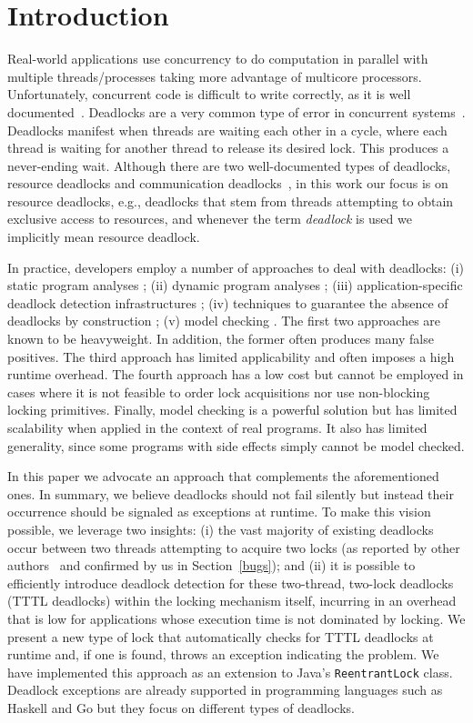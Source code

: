 \section{Introduction}

Real-world applications use concurrency to do computation in parallel with multiple threads/processes taking more advantage of multicore processors. Unfortunately, concurrent code is difficult to write correctly, as it is well documented~\cite{lu}. Deadlocks are a very common type of error in concurrent systems~\cite{lu}.
Deadlocks manifest when threads are waiting each other in a cycle, where each thread is waiting for another thread to release its desired lock. This produces a never-ending wait.
Although there are two well-documented types of deadlocks, resource deadlocks and communication deadlocks~\cite{singhal}\cite{knapp}, in this work our focus is on resource deadlocks, e.g., deadlocks that stem from threads attempting to obtain exclusive access to resources, and whenever the term \emph{deadlock} is used we implicitly mean resource deadlock.

In practice, developers employ a number of approaches to deal with deadlocks: (i) static program analyses \cite{marino}\cite{dawson}\cite{vivek}\cite{williams}; (ii) dynamic program analyses \cite{mcsdk}\cite{magicfuzzer}\cite{sammati}\cite{rx}; (iii) application-specific deadlock detection infrastructures \cite{orderedlock}; (iv) techniques to guarantee the absence of deadlocks by construction \cite{marino}; (v) model checking \cite{havelund}. The first two approaches are known to be heavyweight. In addition, the former often produces many false positives. The third approach has limited applicability and often imposes a high runtime overhead. The fourth approach has a low cost but cannot be employed in cases where it is not feasible to order lock acquisitions nor use non-blocking locking primitives. Finally, model checking is a powerful solution but has limited scalability when applied in the context of real programs. It also has limited generality, since some programs with side effects simply cannot be model checked.  

In this paper we advocate an approach that complements the aforementioned ones. In summary, we believe deadlocks should not fail silently but instead their occurrence  should be signaled as exceptions at runtime. To make this vision possible, we leverage two insights: (i) the vast majority of existing deadlocks occur between two threads attempting to acquire two locks (as reported by other authors~\cite{lu} and confirmed by us in Section~\ref{bugs}); and (ii) it is possible to efficiently introduce deadlock detection for these two-thread, two-lock deadlocks (TTTL deadlocks) within the locking mechanism itself, incurring in an overhead that is low for applications whose execution time is not dominated by locking. We present a new type of lock that automatically checks for TTTL deadlocks at runtime and, if one is found, throws an exception indicating the problem. We have implemented this approach as an extension to Java's {\tt ReentrantLock} class. Deadlock exceptions are already supported in programming languages such as Haskell \cite{marlow} and Go \cite{golang} but they focus on different types of deadlocks.

